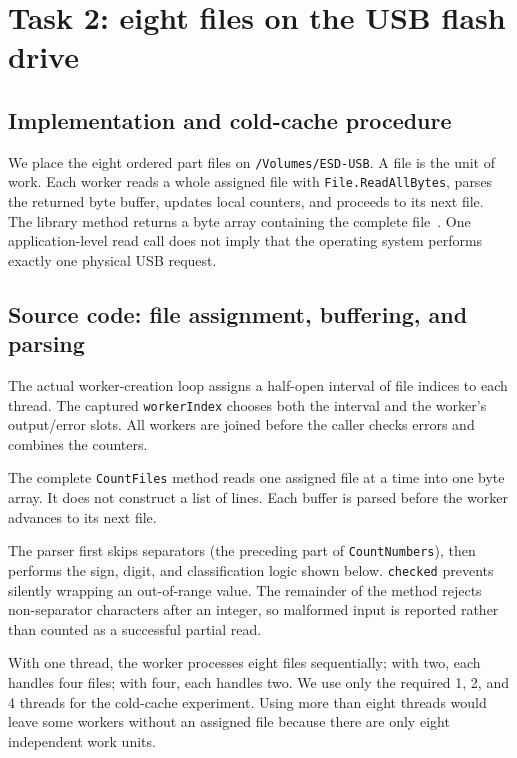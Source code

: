 \chapter{Task 2: eight files on the USB flash drive}
\section{Implementation and cold-cache procedure}
We place the eight ordered part files on \texttt{/Volumes/ESD-USB}. A file is the unit of work. Each worker reads a whole assigned file with \texttt{File.ReadAllBytes}, parses the returned byte buffer, updates local counters, and proceeds to its next file. The library method returns a byte array containing the complete file~\cite{readallbytes}. One application-level read call does not imply that the operating system performs exactly one physical USB request.

\section{Source code: file assignment, buffering, and parsing}
The actual worker-creation loop assigns a half-open interval of file indices to each thread. The captured \texttt{workerIndex} chooses both the interval and the worker's output/error slots. All workers are joined before the caller checks errors and combines the counters.


The complete \texttt{CountFiles} method reads one assigned file at a time into one byte array. It does not construct a list of lines. Each buffer is parsed before the worker advances to its next file.


The parser first skips separators (the preceding part of \texttt{CountNumbers}), then performs the sign, digit, and classification logic shown below. \texttt{checked} prevents silently wrapping an out-of-range value. The remainder of the method rejects non-separator characters after an integer, so malformed input is reported rather than counted as a successful partial read.



With one thread, the worker processes eight files sequentially; with two, each handles four files; with four, each handles two. We use only the required 1, 2, and 4 threads for the cold-cache experiment. Using more than eight threads would leave some workers without an assigned file because there are only eight independent work units.

